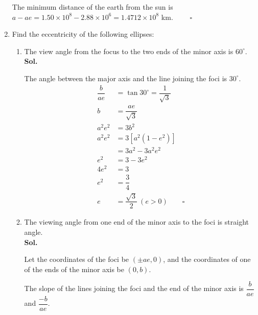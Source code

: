 \documentclass{report}
\newcommand{\sol}{\vspace{1em}\\\textbf{Sol.}}
\newcommand{\eos}{ \qquad \square}
\begin{document}
\begin{enumerate}[leftmargin=*]
          The minimum distance of the earth from the sun is $a - ae = 1.50 \times 10^8 -
              2.88 \times 10^6 = 1.4712 \times 10^8$ km. $\eos$

    \item Find the eccentricity of the following ellipses:
          \begin{enumerate}
              \item The view angle from the focus to the two ends of the minor axis is $60^\circ$.
                    \sol{}

                    The angle between the major axis and the line joining the foci is $30^\circ$.
                    \begin{align*}
                        \dfrac{b}{ae} & = \tan 30^\circ = \dfrac{1}{\sqrt{3}} \\
                        b             & = \dfrac{ae}{\sqrt{3}}                \\
                        a^2e^2        & = 3b^2                                \\
                        a^2e^2        & = 3[a^2(1 - e^2)]                     \\
                                      & = 3a^2 - 3a^2e^2                      \\
                        e^2           & = 3 - 3e^2                            \\
                        4e^2          & = 3                                   \\
                        e^2           & = \dfrac{3}{4}                        \\
                        e             & = \dfrac{\sqrt{3}}{2}\ (e > 0) \eos
                    \end{align*}

              \item The viewing angle from one end of the minor axis to the foci is straight angle.
                    \sol{}

                    Let the coordinates of the foci be $(\pm ae, 0)$, and the coordinates of one of
                    the ends of the minor axis be $(0, b)$.

                    The slope of the lines joining the foci and the end of the minor axis is
                    $\dfrac{b}{ae}$ and $\dfrac{-b}{ae}$.


\end{enumerate}
\end{enumerate}
\end{document}
